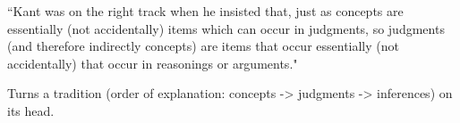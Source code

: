 
``Kant was on the right track when he insisted that, just as concepts are
essentially (not accidentally) items which can occur in judgments, so judgments
(and therefore indirectly concepts) are items that occur essentially (not
accidentally) that occur in reasonings or arguments."

Turns a tradition (order of explanation: concepts -> judgments -> inferences)
on its head.
